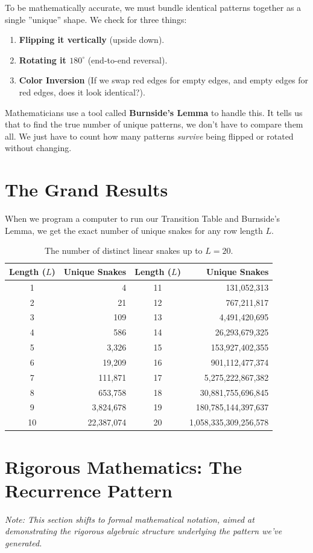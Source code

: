 \documentclass[12pt]{article}
\begin{document}
To be mathematically accurate, we must bundle identical patterns together as a single ''unique'' shape. We check for three things:
\begin{enumerate}
    \item \textbf{Flipping it vertically} (upside down).
    \item \textbf{Rotating it $180^\circ$} (end-to-end reversal).
    \item \textbf{Color Inversion} (If we swap red edges for empty edges, and empty edges for red edges, does it look identical?).
\end{enumerate}

Mathematicians use a tool called \textbf{Burnside's Lemma} to handle this. It tells us that to find the true number of unique patterns, we don't have to compare them all. We just have to count how many patterns \textit{survive} being flipped or rotated without changing. 

\section{The Grand Results}
When we program a computer to run our Transition Table and Burnside's Lemma, we get the exact number of unique snakes for any row length $L$.

\begin{table}[H]
\centering
\begin{tabular}{c r | c r}
\toprule
Length ($L$) & Unique Snakes & Length ($L$) & Unique Snakes \\
\midrule
1 & 4 & 11 & 131,052,313 \\
2 & 21 & 12 & 767,211,817 \\
3 & 109 & 13 & 4,491,420,695 \\
4 & 586 & 14 & 26,293,679,325 \\
5 & 3,326 & 15 & 153,927,402,355 \\
6 & 19,209 & 16 & 901,112,477,374 \\
7 & 111,871 & 17 & 5,275,222,867,382 \\
8 & 653,758 & 18 & 30,881,755,696,845 \\
9 & 3,824,678 & 19 & 180,785,144,397,637 \\
10 & 22,387,074 & 20 & 1,058,335,309,256,578 \\
\bottomrule
\end{tabular}
\caption{The number of distinct linear snakes up to $L=20$.}
\end{table}

\section{Rigorous Mathematics: The Recurrence Pattern}
\textit{Note: This section shifts to formal mathematical notation, aimed at demonstrating the rigorous algebraic structure underlying the pattern we've generated.}
\end{document}
